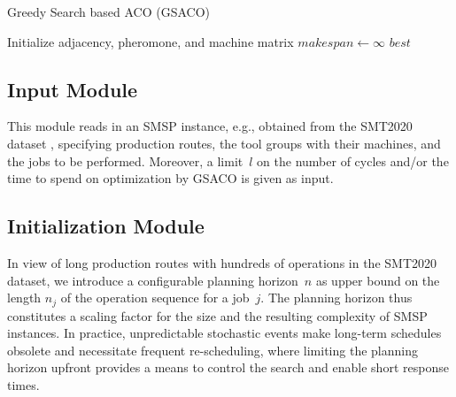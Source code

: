\documentclass[runningheads]{llncs}
\begin{document}
%
\begin{algorithm}[t]
	\caption{Greedy Search based ACO (GSACO)}
	\label{gsaco}
	Initialize 
	adjacency, pheromone, and machine matrix\; %
	$\mathit{makespan}\leftarrow \infty$\; 
		\While{cycle or time limit $l$ is not reached}{
			\ForEach{ant \KwFrom $1$ \KwTo $k$}{
				Run GS procedure to find a schedule\;
			}
			$\mathit{new}\leftarrow {}$ shortest makespan of ants' sched\rlap{ules\;}
			\If{$\mathit{new}<\mathit{makespan}$}{ %
				$\mathit{makespan}\leftarrow \mathit{new}$\;
				$\mathit{best}\leftarrow {}$an ant's schedule of $\mathit{makespan}$\rlap{\;}
			}
			\ForEach{edge $e$ in pheromone matrix}{
				$\tau_{e} \leftarrow \max\{\rho\cdot\tau_e,\tau_z\}$\tcp*[r]{evaporation}%
		}
		\ForEach{edge $e$ selected by $\mathit{best}$ ant}{
			$\tau_{e} \leftarrow \tau_e+c$\tcp*[r]{deposit pheromones}
		}
	}
	\Return $\mathit{best}$\;
\end{algorithm}

\subsection{Input Module}

This module reads in an SMSP instance, e.g.,
obtained from the SMT2020 dataset \cite{kopp2020smt2020},
specifying production routes,
the tool groups with their machines, and the jobs to be performed.
Moreover, a limit~$l$ on the number of cycles and/or the time to spend
on optimization by GSACO is given as input.

\subsection{Initialization Module}
\label{subsec:initialization}
In view of long production routes with hundreds of operations
in the SMT2020 dataset, we introduce a configurable planning horizon~$n$
as upper bound on the length $n_j$ of the operation sequence for a job~$j$.
The planning horizon thus constitutes a scaling factor for the size and
the resulting complexity of SMSP instances.
In practice, unpredictable stochastic events make long-term schedules obsolete and necessitate frequent re-scheduling,
where limiting the planning horizon upfront provides a means to
control the search and enable short response times.
\end{document}

